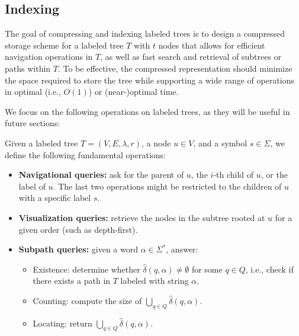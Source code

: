 \subsection{Indexing} \label{compandindexinglabtree}
The goal of compressing and indexing labeled trees is to design a compressed storage scheme for a labeled tree $T$ with $t$ nodes that allows for efficient navigation operations in $T$, as well as fast search and retrieval of subtrees or paths within $T$. To be effective, the compressed representation should minimize the space required to store the tree while supporting a wide range of operations in optimal (i.e., $O(1)$) or (near-)optimal time.

We focus on the following operations on labeled trees, as they will be useful in future sections:
\begin{definition} \label{def:tree_operations}
Given a labeled tree $T = (V, E, \lambda, r)$, a node $u \in V$, and a symbol $s \in \Sigma$, we define the following fundamental operations:

\begin{itemize}
    \item \textbf{Navigational queries:} ask for the parent of $u$, the $i$-th child of $u$, or the label of $u$. The last two operations might be restricted to the children of $u$ with a specific label $s$.
    \item \textbf{Visualization queries:} retrieve the nodes in the subtree rooted at $u$ for a given order (such as depth-first).
    \item \textbf{Subpath queries:} given a word $\alpha \in \Sigma^*$, answer:
    \begin{itemize}
        \item Existence: determine whether $\hat\delta(q,\alpha) \neq \emptyset$ for some $q\in Q$, i.e., check if there exists a path in $T$
        labeled with string $\alpha$.
        \item Counting: compute the size of $\bigcup_{q\in Q} \hat\delta(q,\alpha)$.
        \item Locating: return $\bigcup_{q\in Q} \hat\delta(q,\alpha)$.
    \end{itemize}
\end{itemize}
\end{definition}

